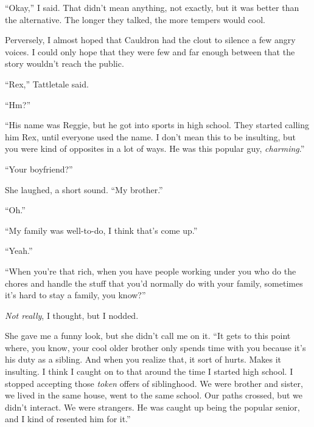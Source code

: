 ``Okay,'' I said.  That didn't mean anything, not exactly, but it was better than the alternative.  The longer they talked, the more tempers would cool.



Perversely, I almost hoped that Cauldron had the clout to silence a few angry voices.  I could only hope that they were few and far enough between that the story wouldn't reach the public.



``Rex,'' Tattletale said.



``Hm?''



``His name was Reggie, but he got into sports in high school.  They started calling him Rex, until everyone used the name.  I don't mean this to be insulting, but you were kind of opposites in a lot of ways.  He was this popular guy, \emph{charming}.''



``Your boyfriend?''



She laughed, a short sound.  ``My brother.''



``Oh.''



``My family was well-to-do, I think that's come up.''



``Yeah.''



``When you're that rich, when you have people working under you who do the chores and handle the stuff that you'd normally do with your family, sometimes it's hard to stay a family, you know?''



\emph{Not really}, I thought, but I nodded.



She gave me a funny look, but she didn't call me on it.  ``It gets to this point where, you know, your cool older brother only spends time with you because it's his duty as a sibling.  And when you realize that, it sort of hurts.  Makes it insulting.  I think I caught on to that around the time I started high school.  I stopped accepting those \emph{token} offers of siblinghood.  We were brother and sister, we lived in the same house, went to the same school.  Our paths crossed, but we didn't interact.  We were strangers.  He was caught up being the popular senior, and I kind of resented him for it.''



